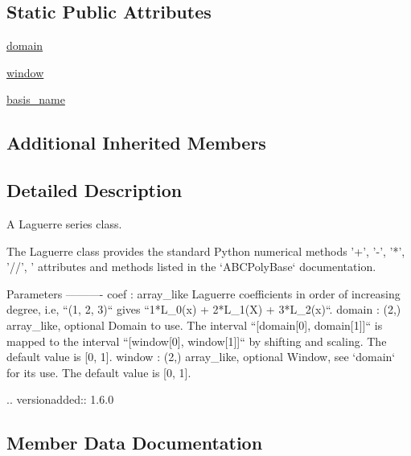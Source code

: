 \subsection*{Static Public Attributes}
\begin{DoxyCompactItemize}
\item 
\hyperlink{classnumpy_1_1polynomial_1_1laguerre_1_1Laguerre_aa16a7bad03d29409b06936a6373e6fb9}{domain}
\item 
\hyperlink{classnumpy_1_1polynomial_1_1laguerre_1_1Laguerre_ac353b07b061f7cb632ee5cf88e6dceba}{window}
\item 
\hyperlink{classnumpy_1_1polynomial_1_1laguerre_1_1Laguerre_a15ddd121f2bbe57b12e6bde995d42bd5}{basis\+\_\+name}
\end{DoxyCompactItemize}
\subsection*{Additional Inherited Members}


\subsection{Detailed Description}
\begin{DoxyVerb}A Laguerre series class.

The Laguerre class provides the standard Python numerical methods
'+', '-', '*', '//', '%
attributes and methods listed in the `ABCPolyBase` documentation.

Parameters
----------
coef : array_like
    Laguerre coefficients in order of increasing degree, i.e,
    ``(1, 2, 3)`` gives ``1*L_0(x) + 2*L_1(X) + 3*L_2(x)``.
domain : (2,) array_like, optional
    Domain to use. The interval ``[domain[0], domain[1]]`` is mapped
    to the interval ``[window[0], window[1]]`` by shifting and scaling.
    The default value is [0, 1].
window : (2,) array_like, optional
    Window, see `domain` for its use. The default value is [0, 1].

    .. versionadded:: 1.6.0\end{DoxyVerb}
 

\subsection{Member Data Documentation}
\mbox{\label{classnumpy_1_1polynomial_1_1laguerre_1_1Laguerre_a15ddd121f2bbe57b12e6bde995d42bd5}} 
